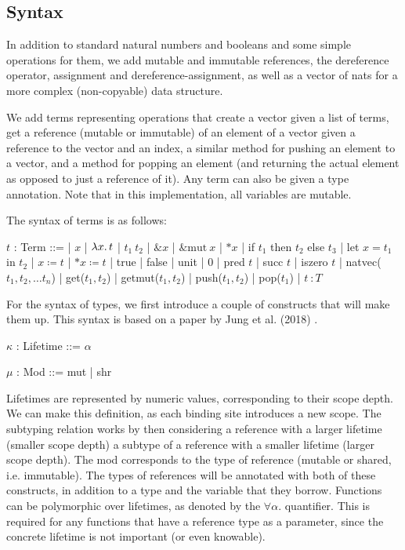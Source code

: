 \documentclass[letterpaper,11pt]{article}
\begin{document}
\subsection{Syntax}
In addition to standard natural numbers and booleans and some simple operations for them, we add
mutable and immutable references, the dereference operator, assignment and
dereference-assignment, as well as a vector of nats for a more complex
(non-copyable) data structure. 

We add terms representing operations that create a vector given a list of terms, 
get a reference (mutable or immutable) of an element of a vector given a reference to the vector and an index, 
a similar method for pushing an element to a vector, and a method for popping an element
(and returning the actual element as opposed to just a reference of it). Any term can also be given a type annotation.
Note that in this implementation, all variables are mutable.

The syntax of terms is as follows:
\begin{center}
    \begin{bnf}
        $t$ : \textsf{Term} ::=
        | $x$ | $\lambda x\ldotp t$ | $t_1\ t_2$ | $\&x$ | $\&\text{mut}\ x$ | $*x$
        | if $t_1$ then $t_2$ else $t_3$
        | let $x = t_1$ in $t_2$
        | $x \coloneq t$
        | $*x \coloneq t$
        | true
        | false
        | unit
        | 0
        | pred $t$
        | succ $t$
        | iszero $t$
        | natvec($t_1,t_2,\dots t_n$)
        | get($t_1,t_2$)
        | getmut($t_1,t_2$)
        | push($t_1,t_2$)
        | pop($t_1$) 
        | $t\ \colon T$
    \end{bnf}
\end{center}

For the syntax of types, we first introduce a couple of constructs that will make
them up. This syntax is based on a paper by Jung et al. (2018) \cite{rustbelt1}.
\begin{center}
    \begin{bnf}
        $\kappa$ : \textsf{Lifetime} ::= $\alpha$
    \end{bnf}

    \begin{bnf}
        $\mu$ : \textsf{Mod} ::= mut | shr
    \end{bnf}
\end{center}
Lifetimes are represented by numeric values, corresponding to their scope depth.
We can make this definition, as each binding site introduces a new scope. The
subtyping relation works by then considering a reference with a larger lifetime (smaller scope depth) a subtype
of a reference with a smaller lifetime (larger scope depth). The mod corresponds to the type
of reference (mutable or shared, i.e. immutable). The types of references will be
annotated with both of these constructs, in addition to a type and the variable that they borrow.
Functions can be polymorphic over lifetimes, as denoted by the $\forall \alpha.$ quantifier. This is required for any functions
that have a reference type as a parameter, since the concrete lifetime is not important (or even knowable).
\end{document}
